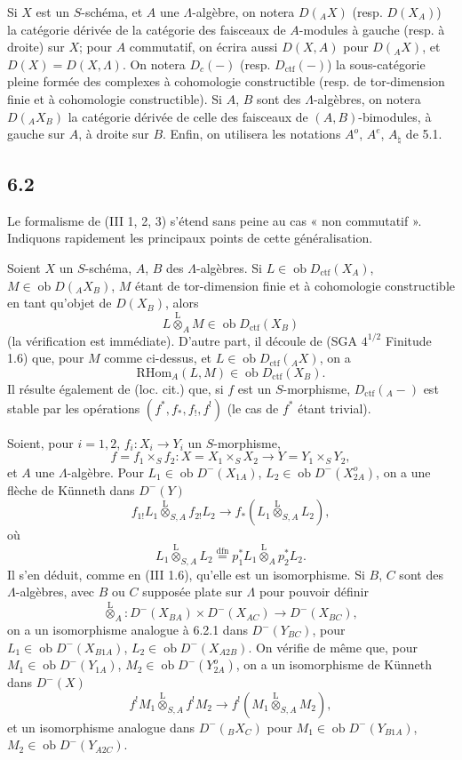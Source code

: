 \documentclass[11pt]{article}
\providecommand{\RHom}{\mathrm{RHom}}
\providecommand{\lten}{\overset{\mathrm L}{\otimes}}
\providecommand{\Ob}{\operatorname{ob}}
\providecommand{\RHom}{\mathrm{RHom}}
\providecommand{\lten}{\overset{\mathrm L}{\otimes}}
\providecommand{\RHom}{\mathrm R\mathcal{H}om}
\providecommand{\lten}{\overset{\mathrm L}{\otimes}}
\providecommand{\Ob}{\operatorname{ob}}
\providecommand{\lten}{\overset{\mathrm L}{\otimes}}
\providecommand{\lten}{\overset{\mathrm L}{\otimes}}
\providecommand{\Ob}{\operatorname{Ob}}
\providecommand{\lten}{\overset{\mathrm L}{\otimes}}
\begin{document}
Si $X$ est un $S$-schéma, et $A$ une $\Lambda$-algèbre, on notera $D({}_AX)$ (resp. $D(X_A)$) la catégorie dérivée de la catégorie des faisceaux de $A$-modules à gauche (resp. à droite) sur $X$; pour $A$ commutatif, on écrira aussi $D(X,A)$ pour $D({}_AX)$, et $D(X)=D(X,\Lambda)$. On notera $D_c(-)$ (resp. $D_{\mathrm{ctf}}(-)$) la sous-catégorie pleine formée des complexes à cohomologie constructible (resp. de tor-dimension finie et à cohomologie constructible). Si $A$, $B$ sont des $\Lambda$-algèbres, on notera $D({}_AX_B)$ la catégorie dérivée de celle des faisceaux de $(A,B)$-bimodules, à gauche sur $A$, à droite sur $B$. Enfin, on utilisera les notations $A^o$, $A^e$, $A_{\natural}$ de 5.1.

\subsection*{6.2}
Le formalisme de (III 1, 2, 3) s'étend sans peine au cas « non commutatif ». Indiquons rapidement les principaux points de cette généralisation.

Soient $X$ un $S$-schéma, $A$, $B$ des $\Lambda$-algèbres. Si $L\in\Ob D_{\mathrm{ctf}}(X_A)$, $M\in\Ob D({}_AX_B)$, $M$ étant de tor-dimension finie et à cohomologie constructible en tant qu'objet de $D(X_B)$, alors
\[
L\lten_A M\in\Ob D_{\mathrm{ctf}}(X_B)
\]
(la vérification est immédiate). D'autre part, il découle de (SGA $4^{1/2}$ Finitude 1.6) que, pour $M$ comme ci-dessus, et $L\in\Ob D_{\mathrm{ctf}}({}_AX)$, on a
\[
\RHom_A(L,M)\in\Ob D_{\mathrm{ctf}}(X_B).
\]
Il résulte également de (loc. cit.) que, si $f$ est un $S$-morphisme, $D_{\mathrm{ctf}}({}_A-)$ est stable par les opérations $(f^*,f_*,f_!,f^!)$ (le cas de $f^*$ étant trivial).

Soient, pour $i=1,2$, $f_i:X_i\to Y_i$ un $S$-morphisme,
\[
f=f_1\times_S f_2:X=X_1\times_SX_2\longrightarrow Y=Y_1\times_SY_2,
\]
et $A$ une $\Lambda$-algèbre. Pour $L_1\in\Ob D^-(X_{1A})$, $L_2\in\Ob D^-(X_{2A}^o)$, on a une flèche de Künneth dans $D^-(Y)$
\begin{equation}
f_{1!}L_1\lten_{S,A}f_{2!}L_2
\longrightarrow
f_*(L_1\lten_{S,A}L_2),
\tag{6.2.1}
\end{equation}
où
\[
L_1\lten_{S,A}L_2
\stackrel{\mathrm{dfn}}{=}p_1^*L_1\lten_Ap_2^*L_2.
\]
Il s'en déduit, comme en (III 1.6), qu'elle est un isomorphisme. Si $B$, $C$ sont des $\Lambda$-algèbres, avec $B$ ou $C$ supposée plate sur $\Lambda$ pour pouvoir définir
\[
\lten_A:D^-(X_{BA})\times D^-(X_{AC})\longrightarrow D^-(X_{BC}),
\]
on a un isomorphisme analogue à 6.2.1 dans $D^-(Y_{BC})$, pour $L_1\in\Ob D^-(X_{B1A})$, $L_2\in\Ob D^-(X_{A2B})$. On vérifie de même que, pour $M_1\in\Ob D^-(Y_{1A})$, $M_2\in\Ob D^-(Y_{2A}^o)$, on a un isomorphisme de Künneth dans $D^-(X)$
\begin{equation}
f^!M_1\lten_{S,A}f^!M_2
\longrightarrow
f^!(M_1\lten_{S,A}M_2),
\tag{6.2.2}
\end{equation}
et un isomorphisme analogue dans $D^-({}_B X_C)$ pour $M_1\in\Ob D^-(Y_{B1A})$, $M_2\in\Ob D^-(Y_{A2C})$.
\end{document}
